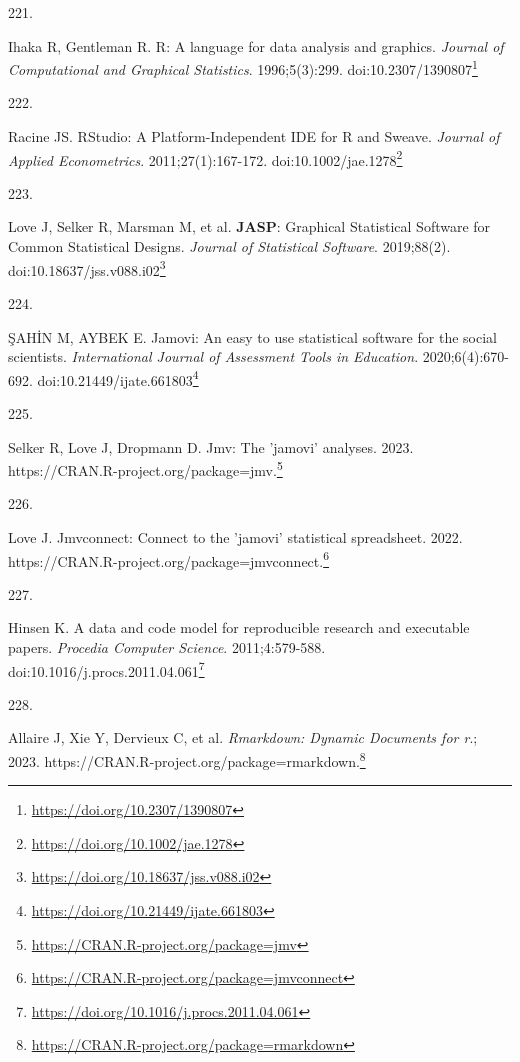 \documentclass[
  a4paper,
]{book}
\newlength{\cslhangindent}
\newlength{\csllabelwidth}
\newlength{\cslentryspacingunit} %
\newenvironment{CSLReferences}[2] %
 {%
  \setlength{\parindent}{0pt}
  \ifodd #1
  \let\oldpar\par
  \def\par{\hangindent=\cslhangindent\oldpar}
  \fi
  \setlength{\parskip}{#2\cslentryspacingunit}
 }%
 {}
\newcommand{\CSLLeftMargin}[1]{\parbox[t]{\csllabelwidth}{#1}}
\newcommand{\CSLRightInline}[1]{\parbox[t]{\linewidth - \csllabelwidth}{#1}\break}
\renewcommand{\href}[2]{#2\footnote{\url{#1}}}
\begin{document}
\begin{CSLReferences}{0}{0}
\leavevmode{}%
\CSLLeftMargin{221. }%
\CSLRightInline{Ihaka R, Gentleman R. R: A language for data analysis and graphics. \emph{Journal of Computational and Graphical Statistics}. 1996;5(3):299. doi:\href{https://doi.org/10.2307/1390807}{10.2307/1390807}}

\leavevmode{}%
\CSLLeftMargin{222. }%
\CSLRightInline{Racine JS. RStudio: A Platform{-}Independent IDE for R and Sweave. \emph{Journal of Applied Econometrics}. 2011;27(1):167-172. doi:\href{https://doi.org/10.1002/jae.1278}{10.1002/jae.1278}}

\leavevmode{}%
\CSLLeftMargin{223. }%
\CSLRightInline{Love J, Selker R, Marsman M, et al. {\textbf{JASP}}: Graphical Statistical Software for Common Statistical Designs. \emph{Journal of Statistical Software}. 2019;88(2). doi:\href{https://doi.org/10.18637/jss.v088.i02}{10.18637/jss.v088.i02}}

\leavevmode{}%
\CSLLeftMargin{224. }%
\CSLRightInline{ŞAHİN M, AYBEK E. Jamovi: An easy to use statistical software for the social scientists. \emph{International Journal of Assessment Tools in Education}. 2020;6(4):670-692. doi:\href{https://doi.org/10.21449/ijate.661803}{10.21449/ijate.661803}}

\leavevmode{}%
\CSLLeftMargin{225. }%
\CSLRightInline{Selker R, Love J, Dropmann D. Jmv: The 'jamovi' analyses. 2023. \href{https://CRAN.R-project.org/package=jmv}{https://CRAN.R-project.org/package=jmv.}}

\leavevmode{}%
\CSLLeftMargin{226. }%
\CSLRightInline{Love J. Jmvconnect: Connect to the 'jamovi' statistical spreadsheet. 2022. \href{https://CRAN.R-project.org/package=jmvconnect}{https://CRAN.R-project.org/package=jmvconnect.}}

\leavevmode{}%
\CSLLeftMargin{227. }%
\CSLRightInline{Hinsen K. A data and code model for reproducible research and executable papers. \emph{Procedia Computer Science}. 2011;4:579-588. doi:\href{https://doi.org/10.1016/j.procs.2011.04.061}{10.1016/j.procs.2011.04.061}}

\leavevmode{}%
\CSLLeftMargin{228. }%
\CSLRightInline{Allaire J, Xie Y, Dervieux C, et al. \emph{Rmarkdown: Dynamic Documents for r}.; 2023. \href{https://CRAN.R-project.org/package=rmarkdown}{https://CRAN.R-project.org/package=rmarkdown.}}


\end{CSLReferences}
\end{document}
